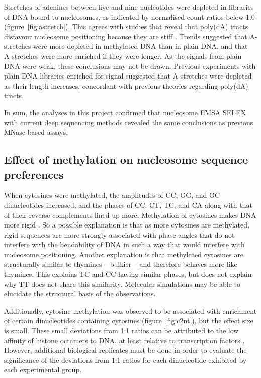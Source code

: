 \documentclass[parskip=full, numbers=noenddot]{scrreprt}
\begin{document}
Stretches of adenines between five and nine nucleotides were depleted in libraries of DNA bound to nucleosomes, as indicated by normalised count ratios below 1.0 (figure~\ref{fig:astretch}).  This agrees with studies that reveal that poly(dA) tracts disfavour nucleosome positioning because they are stiff \citep{struhl_determinants_2013}.  Trends suggested that A-stretches were more depleted in methylated DNA than in plain DNA, and that A-stretches were more enriched if they were longer.  As the signals from plain DNA were weak, these conclusions may not be drawn.  Previous experiments with plain DNA libraries enriched for signal suggested that A-stretches were depleted as their length increases, concordant with previous theories regarding poly(dA) tracts.

In sum, the analyses in this project confirmed that nucleosome EMSA SELEX with current deep sequencing methods revealed the same conclusions as previous MNase-based assays.  %

\subsection{Effect of methylation on nucleosome sequence preferences}
\label{ssec:emsaselex_discussion_methyl}

When cytosines were methylated, the amplitudes of CC, GG, and GC dinucleotides increased, and the phases of CC, CT, TC, and CA along with that of their reverse complements lined up more.  Methylation of cytosines makes DNA more rigid \citep{rao_systematic_2018, perez_impact_2012}.  So a possible explanation is that as more cytosines are methylated, rigid sequences are more strongly associated with phase angles that do not interfere with the bendability of DNA in such a way that would interfere with nucleosome positioning.  Another explanation is that methylated cytosines are structurally similar to thymines -- bulkier -- and therefore behaves more like thymines.  This explains TC and CC having similar phases, but does not explain why TT does not share this similarity.  Molecular simulations may be able to elucidate the structural basis of the observations.

Additionally, cytosine methylation was observed to be associated with enrichment of certain dinucleotides containing cytosines (figure~\ref{fig:c2nt}), but the effect size is small.  These small deviations from 1:1 ratios can be attributed to the low affinity of histone octamers to DNA, at least relative to transcription factors \citep{struhl_determinants_2013}. %
However, additional biological replicates must be done in order to evaluate the significance of the deviations from 1:1 ratios for each dinucleotide exhibited by each experimental group.
\end{document}
